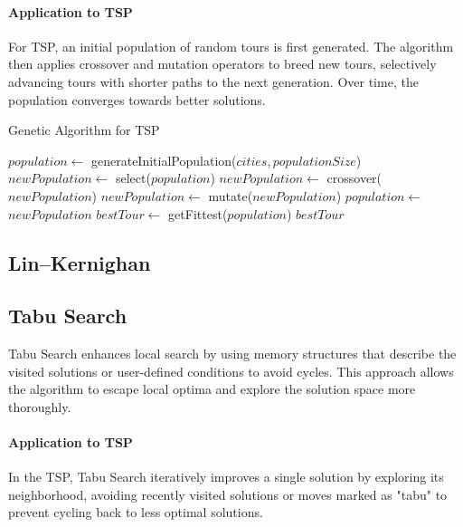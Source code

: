 \paragraph{Application to TSP}

For TSP, an initial population of random tours is first generated. The algorithm then applies crossover and mutation operators to breed new tours, selectively advancing tours with shorter paths to the next generation. Over time, the population converges towards better solutions.

\begin{algorithm}
	\caption{Genetic Algorithm for TSP}\label{alg:geneticalgorithm}
	\begin{algorithmic}[1]
		\State $population \gets$ generateInitialPopulation($cities, populationSize$)
		\State $newPopulation \gets$ select($population$)
		\State $newPopulation \gets$ crossover($newPopulation$)
		\State $newPopulation \gets$ mutate($newPopulation$)
		\State $population \gets$ $newPopulation$
		\EndFor
		\State $bestTour \gets$ getFittest($population$)
		\State \Return $bestTour$
		\EndProcedure
	\end{algorithmic}
\end{algorithm}

\subsection{Lin–Kernighan}

\subsection{Tabu Search}

Tabu Search enhances local search by using memory structures that describe the visited solutions or user-defined conditions to avoid cycles. This approach allows the algorithm to escape local optima and explore the solution space more thoroughly.

\paragraph{Application to TSP}

In the TSP, Tabu Search iteratively improves a single solution by exploring its neighborhood, avoiding recently visited solutions or moves marked as "tabu" to prevent cycling back to less optimal solutions.

